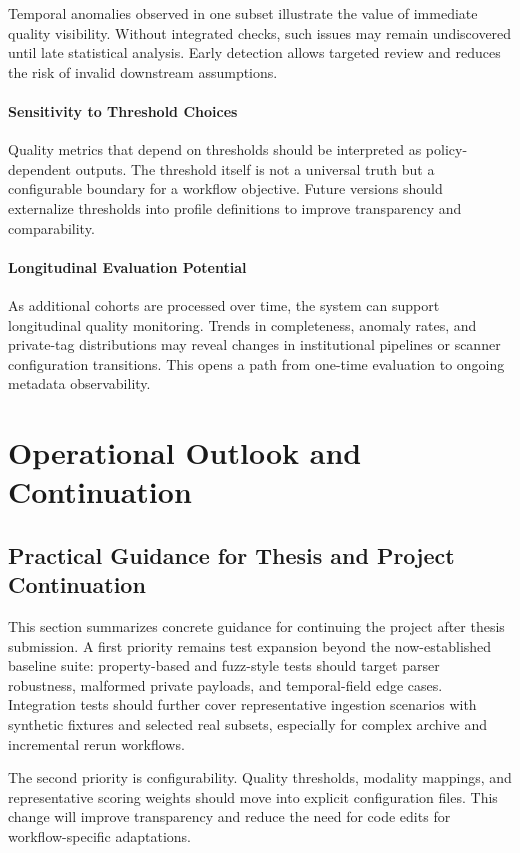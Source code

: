 Temporal anomalies observed in one subset illustrate the value of immediate quality visibility. Without integrated checks, such issues may remain undiscovered until late statistical analysis. Early detection allows targeted review and reduces the risk of invalid downstream assumptions.

\paragraph{Sensitivity to Threshold Choices}
Quality metrics that depend on thresholds should be interpreted as policy-dependent outputs. The threshold itself is not a universal truth but a configurable boundary for a workflow objective. Future versions should externalize thresholds into profile definitions to improve transparency and comparability.

\paragraph{Longitudinal Evaluation Potential}
As additional cohorts are processed over time, the system can support longitudinal quality monitoring. Trends in completeness, anomaly rates, and private-tag distributions may reveal changes in institutional pipelines or scanner configuration transitions. This opens a path from one-time evaluation to ongoing metadata observability.

\section{Operational Outlook and Continuation}
\subsection{Practical Guidance for Thesis and Project Continuation}
This section summarizes concrete guidance for continuing the project after thesis submission. A first priority remains test expansion beyond the now-established baseline suite: property-based and fuzz-style tests should target parser robustness, malformed private payloads, and temporal-field edge cases. Integration tests should further cover representative ingestion scenarios with synthetic fixtures and selected real subsets, especially for complex archive and incremental rerun workflows.

The second priority is configurability. Quality thresholds, modality mappings, and representative scoring weights should move into explicit configuration files. This change will improve transparency and reduce the need for code edits for workflow-specific adaptations.


